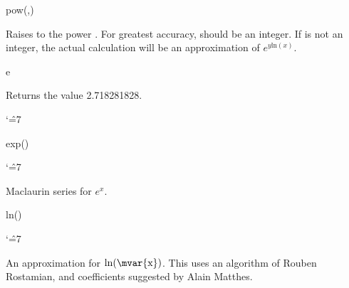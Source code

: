 \begin{math-function}{pow(,)}
\mathcommand

 Raises  to the power . For greatest accuracy,
  should be an integer. If  is not an integer,
 the actual calculation will be an approximation of $e^{y\text{ln}(x)}$.

\begin{codeexample}[]
 \pgfmathresult
\end{codeexample}

\end{math-function}


\begin{math-function}{e}
\mathcommand

  Returns the value 2.718281828.
{
\catcode`\^=7

\begin{codeexample}[]
 \pgfmathresult
\end{codeexample}

}
\end{math-function}

\begin{math-function}{exp()}
\mathcommand

{
\catcode`\^=7

	Maclaurin series for $e^x$.
}	
\begin{codeexample}[]
 \pgfmathresult
\end{codeexample}

\begin{codeexample}[]
 \pgfmathresult
\end{codeexample}

\end{math-function}


\begin{math-function}{ln()}
\mathcommand

{
\catcode`\^=7

	An approximation for $\ln(\textrm{\mvar{x}})$.
	This uses an algorithm of Rouben Rostamian, and coefficients
	suggested by Alain Matthes.
}	
\begin{codeexample}[]
 \pgfmathresult
\end{codeexample}

\begin{codeexample}[]
 \pgfmathresult
\end{codeexample}

\end{math-function}

